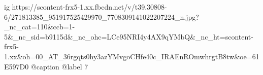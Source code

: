  
 
 
 
 

\ifcmt
  ig https://scontent-frx5-1.xx.fbcdn.net/v/t39.30808-6/271813385_951917525429970_7708309141022207224_n.jpg?_nc_cat=110&ccb=1-5&_nc_sid=b9115d&_nc_ohc=LCe95NRI4y4AX9qYMbQ&_nc_ht=scontent-frx5-1.xx&oh=00_AT_36rgqts0hy3azYMvgoCHfe40c_IRAEnROmwhrgtB8tw&oe=61E597D0
  @caption @label 7
\fi
